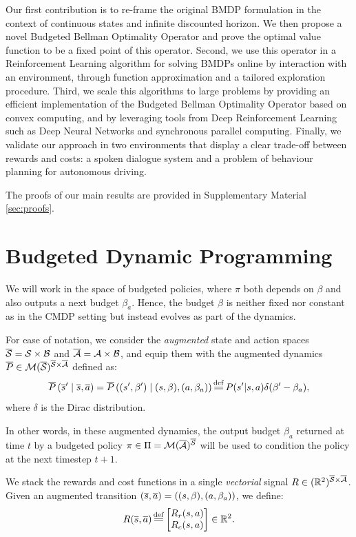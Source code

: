 \documentclass{article}
\begin{document}
Our first contribution is to re-frame the original BMDP formulation in the context of continuous states and infinite discounted horizon. We then propose a novel Budgeted Bellman Optimality Operator and prove the optimal value function to be a fixed point of this operator. Second, we use this operator in a Reinforcement Learning algorithm for solving BMDPs online by interaction with an environment, through function approximation and a tailored exploration procedure. Third, we scale this algorithms to large problems by providing an efficient implementation of the Budgeted Bellman Optimality Operator based on convex computing, and by leveraging tools from Deep Reinforcement Learning such as Deep Neural Networks and synchronous parallel computing. Finally, we validate our approach in two environments that display a clear trade-off between rewards and costs: a spoken dialogue system and a problem of behaviour planning for autonomous driving.

The proofs of our main results are provided in Supplementary Material \ref{sec:proofs}.

\section{Budgeted Dynamic Programming}

We will work in the space of budgeted policies, where $\pi$ both depends on $\beta$ and also outputs a next budget $\beta_a$. Hence, the budget $\beta$ is neither fixed nor constant as in the CMDP setting but instead evolves as part of the dynamics.

For ease of notation, we consider the \emph{augmented} state and action spaces $\overline{\mathcal{S}} = \mathcal{S}\times \mathcal{B}$ and $\overline{\mathcal{A}}= \mathcal{A}\times \mathcal{B}$, and equip them with the augmented dynamics $\overline{P}\in \mathcal{M}(\overline{\mathcal{S}})^{\overline{\mathcal{S}} \times \overline{\mathcal{A}}}$ defined as:
\begin{equation*}
    \ov{P}\left(\os' \condbar \os, \oa\right) = \ov{P}\left((s',\beta') \condbar (s,\beta), (a, \beta_a)\right) \eqdef P(s'|s, a)\delta(\beta' - \beta_a),
\end{equation*}
where $\delta$ is the Dirac distribution. 

In other words, in these augmented dynamics, the output budget $\beta_a$ returned at time $t$ by a budgeted policy $\pi\in \Pi=\mathcal{M}(\overline{\mathcal{A}})^{\overline{\mathcal{S}}}$ will be used to condition the policy at the next timestep $t+1$.

We stack the rewards and cost functions in a single \emph{vectorial} signal $R \in (\mathbb{R}^2)^{{\overline{\mathcal{S}} \times \overline{\mathcal{A}}}}$.
Given an augmented transition $(\overline{s}, \overline{a}) =((s,\beta), (a, \beta_a))$, we define:
\begin{equation}
     R(\os, \oa) \eqdef  \begin{bmatrix}
     R_r(s, a)\\
     R_c(s, a)
     \end{bmatrix}\in\Real^2.
\end{equation}
\end{document}
